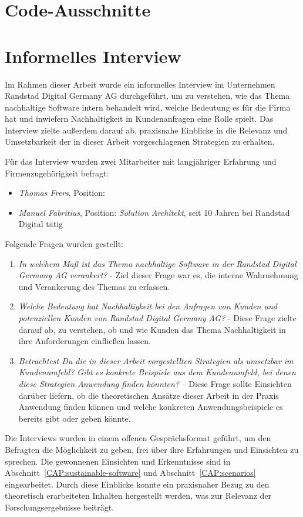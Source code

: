 \chapter{Code-Ausschnitte}




\chapter{Informelles Interview}\label{CAP:interview}
Im Rahmen dieser Arbeit wurde ein informelles Interview im Unternehmen Randstad Digital Germany AG durchgeführt, um zu verstehen, wie das Thema nachhaltige Software intern behandelt wird, welche Bedeutung es für die Firma hat und inwiefern Nachhaltigkeit in Kundenanfragen eine Rolle spielt.
Das Interview zielte außerdem darauf ab, praxisnahe Einblicke in die Relevanz und Umsetzbarkeit der in dieser Arbeit vorgeschlagenen Strategien zu erhalten.

Für das Interview wurden zwei Mitarbeiter mit langjähriger Erfahrung und Firmenzugehörigkeit befragt:
\begin{itemize}
    \item \textit{Thomas Frers}, Position: \textit{}
    \item \textit{Manuel Fabritius}, Position: \textit{Solution Architekt}, seit 10 Jahren bei Randstad Digital tätig
\end{itemize}
Folgende Fragen wurden gestellt:
\begin{enumerate}
    \item \textit{\glqq In welchem Maß ist das Thema nachhaltige Software in der Randstad Digital Germany AG verankert?\grqq{}} - Ziel dieser Frage war es, die interne Wahrnehmung und Verankerung des Themas zu erfassen.
    \item \textit{\glqq Welche Bedeutung hat Nachhaltigkeit bei den Anfragen von Kunden und potenziellen Kunden von Randstad Digital Germany AG?\grqq{}} - Diese Frage zielte darauf ab, zu verstehen, ob und wie Kunden das Thema Nachhaltigkeit in ihre Anforderungen einfließen lassen.
    \item \textit{\glqq Betrachtest Du die in dieser Arbeit vorgestellten Strategien als umsetzbar im Kundenumfeld? Gibt es konkrete Beispiele aus dem Kundenumfeld, bei denen diese Strategien Anwendung finden könnten?\grqq{}}  – Diese Frage sollte Einsichten darüber liefern, ob die theoretischen Ansätze dieser Arbeit in der Praxis Anwendung finden können und welche konkreten Anwendungsbeispiele es bereits gibt oder geben könnte.
\end{enumerate}
Die Interviews wurden in einem offenen Gesprächsformat geführt, um den Befragten die Möglichkeit zu geben, frei über ihre Erfahrungen und Einsichten zu sprechen.
Die gewonnenen Einsichten und Erkenntnisse sind in Abschnitt~\ref{CAP:sustainable-software} und Abschnitt~\ref{CAP:scenarios} eingearbeitet.
Durch diese Einblicke konnte ein praxisnaher Bezug zu den theoretisch erarbeiteten Inhalten hergestellt werden, was zur Relevanz der Forschungsergebnisse beiträgt.
